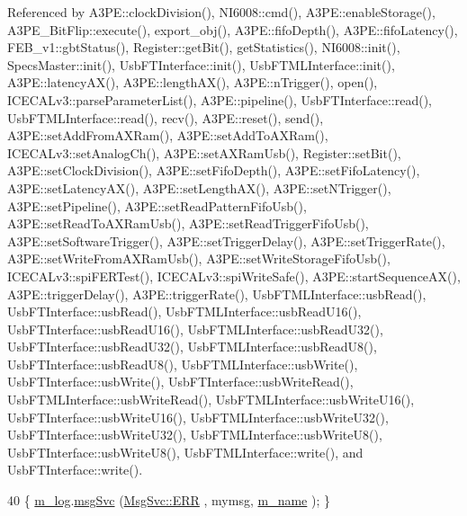 Referenced by A3\+P\+E\+::clock\+Division(), N\+I6008\+::cmd(), A3\+P\+E\+::enable\+Storage(), A3\+P\+E\+\_\+\+Bit\+Flip\+::execute(), export\+\_\+obj(), A3\+P\+E\+::fifo\+Depth(), A3\+P\+E\+::fifo\+Latency(), F\+E\+B\+\_\+v1\+::gbt\+Status(), Register\+::get\+Bit(), get\+Statistics(), N\+I6008\+::init(), Specs\+Master\+::init(), Usb\+F\+T\+Interface\+::init(), Usb\+F\+T\+M\+L\+Interface\+::init(), A3\+P\+E\+::latency\+A\+X(), A3\+P\+E\+::length\+A\+X(), A3\+P\+E\+::n\+Trigger(), open(), I\+C\+E\+C\+A\+Lv3\+::parse\+Parameter\+List(), A3\+P\+E\+::pipeline(), Usb\+F\+T\+Interface\+::read(), Usb\+F\+T\+M\+L\+Interface\+::read(), recv(), A3\+P\+E\+::reset(), send(), A3\+P\+E\+::set\+Add\+From\+A\+X\+Ram(), A3\+P\+E\+::set\+Add\+To\+A\+X\+Ram(), I\+C\+E\+C\+A\+Lv3\+::set\+Analog\+Ch(), A3\+P\+E\+::set\+A\+X\+Ram\+Usb(), Register\+::set\+Bit(), A3\+P\+E\+::set\+Clock\+Division(), A3\+P\+E\+::set\+Fifo\+Depth(), A3\+P\+E\+::set\+Fifo\+Latency(), A3\+P\+E\+::set\+Latency\+A\+X(), A3\+P\+E\+::set\+Length\+A\+X(), A3\+P\+E\+::set\+N\+Trigger(), A3\+P\+E\+::set\+Pipeline(), A3\+P\+E\+::set\+Read\+Pattern\+Fifo\+Usb(), A3\+P\+E\+::set\+Read\+To\+A\+X\+Ram\+Usb(), A3\+P\+E\+::set\+Read\+Trigger\+Fifo\+Usb(), A3\+P\+E\+::set\+Software\+Trigger(), A3\+P\+E\+::set\+Trigger\+Delay(), A3\+P\+E\+::set\+Trigger\+Rate(), A3\+P\+E\+::set\+Write\+From\+A\+X\+Ram\+Usb(), A3\+P\+E\+::set\+Write\+Storage\+Fifo\+Usb(), I\+C\+E\+C\+A\+Lv3\+::spi\+F\+E\+R\+Test(), I\+C\+E\+C\+A\+Lv3\+::spi\+Write\+Safe(), A3\+P\+E\+::start\+Sequence\+A\+X(), A3\+P\+E\+::trigger\+Delay(), A3\+P\+E\+::trigger\+Rate(), Usb\+F\+T\+M\+L\+Interface\+::usb\+Read(), Usb\+F\+T\+Interface\+::usb\+Read(), Usb\+F\+T\+M\+L\+Interface\+::usb\+Read\+U16(), Usb\+F\+T\+Interface\+::usb\+Read\+U16(), Usb\+F\+T\+M\+L\+Interface\+::usb\+Read\+U32(), Usb\+F\+T\+Interface\+::usb\+Read\+U32(), Usb\+F\+T\+M\+L\+Interface\+::usb\+Read\+U8(), Usb\+F\+T\+Interface\+::usb\+Read\+U8(), Usb\+F\+T\+M\+L\+Interface\+::usb\+Write(), Usb\+F\+T\+Interface\+::usb\+Write(), Usb\+F\+T\+Interface\+::usb\+Write\+Read(), Usb\+F\+T\+M\+L\+Interface\+::usb\+Write\+Read(), Usb\+F\+T\+M\+L\+Interface\+::usb\+Write\+U16(), Usb\+F\+T\+Interface\+::usb\+Write\+U16(), Usb\+F\+T\+M\+L\+Interface\+::usb\+Write\+U32(), Usb\+F\+T\+Interface\+::usb\+Write\+U32(), Usb\+F\+T\+M\+L\+Interface\+::usb\+Write\+U8(), Usb\+F\+T\+Interface\+::usb\+Write\+U8(), Usb\+F\+T\+M\+L\+Interface\+::write(), and Usb\+F\+T\+Interface\+::write().


\begin{DoxyCode}
40 \{ \hyperlink{classObject_a0d269813dd7ac1f24bc143031e2963f2}{m\_log}.\hyperlink{classMsgSvc_ad25f18047920cc59a314e5098259711c}{msgSvc} (\hyperlink{classMsgSvc_ae671eb7301996cd049d2da8a65925926a35a9d7166e9896af4ec8fb33bf5f1772}{MsgSvc::ERR}     , mymsg, \hyperlink{classObject_a8b83c95c705d2c3ba0d081fe1710f48d}{m\_name} ); \}
\end{DoxyCode}
\mbox{\label{classObject_ad7f6c457733082efa2f9ff5f5c8e119a}} 
